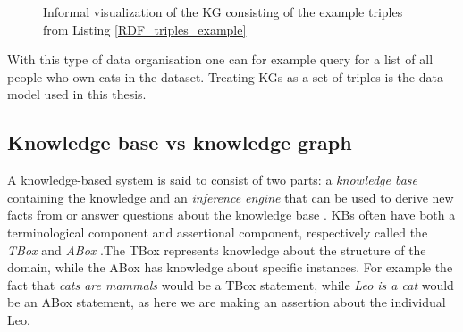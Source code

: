\begin{figure}[htbp]
\centering
{}

\caption[Visualization of RDF triple example in listing \ref{RDF_triples_example}]{Informal visualization of the KG consisting of the example triples from Listing \ref{RDF_triples_example}} \label{fig:KG_example_2}
\end{figure}

With this type of data organisation one can for example query for a list of all people who own cats in the dataset. Treating KGs as a set of triples is the data model used in this thesis.


\subsection{Knowledge base vs knowledge graph}
A knowledge-based system is said to consist of two parts: a \textit{knowledge base} containing the knowledge and an \textit{inference engine} that can be used to derive new facts from or answer questions about the knowledge base \cite{akerkar2009knowledge}. KBs often have both a terminological component and assertional component, respectively called the \textit{TBox} and \textit{ABox} \cite{brachman1989overview}.The TBox represents knowledge about the structure of the domain, while the ABox has knowledge about specific instances. For example the fact that \emph{cats are  mammals} would be a TBox statement, while \emph{Leo is a cat} would be an ABox statement, as here we are making an assertion about the individual Leo.

